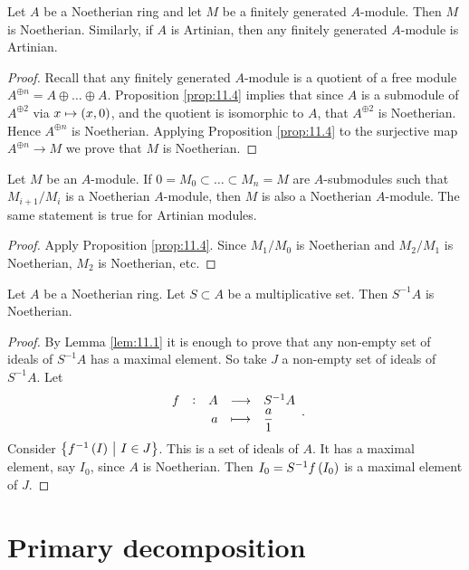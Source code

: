 \begin{corollary}
Let $ A $ be a Noetherian ring and let $ M $ be a finitely generated $ A $-module. Then $ M $ is Noetherian. Similarly, if $ A $ is Artinian, then any finitely generated $ A $-module is Artinian.
\end{corollary}

\begin{proof}
Recall that any finitely generated $ A $-module is a quotient of a free module $ A^{\oplus n} = A \oplus \dots \oplus A $. Proposition \ref{prop:11.4} implies that since $ A $ is a submodule of $ A^{\oplus 2} $ via $ x \mapsto \br{x, 0} $, and the quotient is isomorphic to $ A $, that $ A^{\oplus 2} $ is Noetherian. Hence $ A^{\oplus n} $ is Noetherian. Applying Proposition \ref{prop:11.4} to the surjective map $ A^{\oplus n} \to M $ we prove that $ M $ is Noetherian.
\end{proof}

\begin{corollary}
\label{cor:11.6}
Let $ M $ be an $ A $-module. If $ 0 = M_0 \subset \dots \subset M_n = M $ are $ A $-submodules such that $ M_{i + 1} / M_i $ is a Noetherian $ A $-module, then $ M $ is also a Noetherian $ A $-module. The same statement is true for Artinian modules.
\end{corollary}

\begin{proof}
Apply Proposition \ref{prop:11.4}. Since $ M_1 / M_0 $ is Noetherian and $ M_2 / M_1 $ is Noetherian, $ M_2 $ is Noetherian, etc.
\end{proof}

\begin{lemma}
\label{lem:11.7}
Let $ A $ be a Noetherian ring. Let $ S \subset A $ be a multiplicative set. Then $ S^{-1}A $ is Noetherian.
\end{lemma}

\begin{proof}
By Lemma \ref{lem:11.1} it is enough to prove that any non-empty set of ideals of $ S^{-1}A $ has a maximal element. So take $ J $ a non-empty set of ideals of $ S^{-1}A $. Let
$$ \function[f]{A}{S^{-1}A}{a}{\dfrac{a}{1}}. $$
Consider $ \cbr{f^{-1}\br{I} \st I \in J} $. This is a set of ideals of $ A $. It has a maximal element, say $ I_0 $, since $ A $ is Noetherian. Then $ I_0 = S^{-1}f\br{I_0} $ is a maximal element of $ J $.
\end{proof}

\pagebreak

\section{Primary decomposition}

